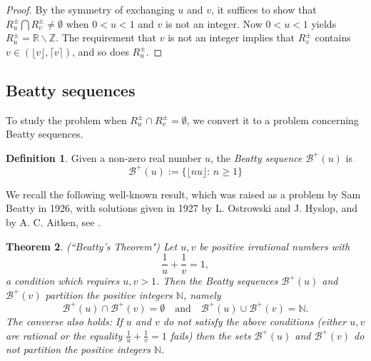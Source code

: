\documentclass[12pt,letterpaper, reqno]{amsart}
\newtheorem{thm}{Theorem}[section]
\theoremstyle{definition}
\newtheorem{defi}[thm]{Definition}
\theoremstyle{remark}
\newcommand{\RR}{\ensuremath{\mathbb{R}}}
\newcommand{\ZZ}{\ensuremath{\mathbb{Z}}}
\newcommand{\NN}{\mathbb{N}}
\newcommand{\R}{{R}}
\newcommand{\sB}{{\mathcal B}}
\newcommand{\floor}[1]{\lfloor{#1}\rfloor}
\newcommand{\ceil}[1]{\lceil{#1}\rceil}
\begin{document}
\begin{proof}
By the symmetry of exchanging $u$ and $v$, it suffices to show that
$R_u^{\pm} \bigcap \R_v^{\pm} \ne \emptyset$
when $0< u< 1$ and $v$ is not an integer. 
Now $0<u<1$ yields $R_u^{\pm} = \RR \smallsetminus \ZZ$.
The requirement that  $v$ is not an integer implies that $R_v^{\pm}$ contains $v\in (\floor v,\ceil v)$, and so does $R_u^{\pm}$.
\end{proof}  
  


\subsection{Beatty sequences}
To study the problem when $\R^\pm_u\cap \R^\pm_v = \emptyset $, we convert it
to a problem concerning Beatty sequences.

\begin{defi}\label{def:44}
 Given a non-zero real number $u$, the {\em Beatty sequence} $\sB^{+}(u)$
is
$$
\sB^{+}(u) := \{ \lfloor n u \rfloor: \,  n \ge 1\}
$$
\end{defi}

We recall the following well-known result, which was raised as a problem 
by Sam Beatty 
in 1926, with solutions given in  1927 by L. Ostrowski and J. Hyslop, 
and by A. C. Aitken,  see \cite{Bea26}.

\begin{thm}\label{thm:44} {\em (``Beatty's Theorem") }
Let $u, v$ be positive irrational numbers with 
$$
\frac{1}{u} + \frac{1}{v} =1,
$$
 a condition which requires $u, v >1$. 
Then the Beatty sequences $\sB^{+}(u)$ and $\sB^{+}(v)$
partition the positive integers $\NN$, namely
$$
\sB^{+}(u) \cap \sB^{+}(v) = \emptyset \quad \mbox{and} \quad \sB^{+}(u) \cup \sB^{+}(v) = \NN.
$$
The converse also holds: If $u$ and $v$ do not satisfy the above conditions (either $u,v$ are rational or the equality $\frac1u + \frac1v = 1$ fails) then the sets $\sB^{+}(u)$ and $\sB^{+}(v)$  do not partition the positive integers $\NN$.
\end{thm}
\end{document}
